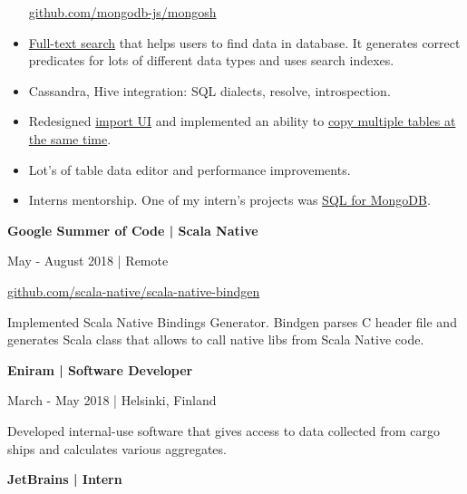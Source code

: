 \documentclass[9pt]{article}
\begin{document}
\begin{multicols}{2}
\begin{itemize}
\href{https://github.com/mongodb-js/mongosh/tree/main/packages/java-shell}{github.com/mongodb-js/mongosh}
\item \href{https://www.jetbrains.com/datagrip/whatsnew/2019-2/#version-2019-2-full-text-search}{Full-text search} that helps users to find data in database. It generates correct predicates for lots of different data types and uses search indexes.
\item Cassandra, Hive integration: SQL dialects, resolve, introspection.
\item Redesigned \href{https://www.jetbrains.com/datagrip/whatsnew/2021-3/#importexport}{import UI} and implemented an ability to \href{https://www.jetbrains.com/datagrip/whatsnew/2022-1/#importexport}{copy multiple tables at the same time}.
\item Lot's of table data editor and performance improvements.
\item Interns mentorship. One of my intern's projects was \href{https://www.jetbrains.com/datagrip/whatsnew/2020-3/#version-2020-3-sql-for-mongodb}{SQL for MongoDB}.
\end{itemize}

\vspace{1em}

{\textbf{Google Summer of Code | Scala Native}}

\color{gray} May - August 2018 | Remote \color{black}

\href{https://github.com/scala-native/scala-native-bindgen}{github.com/scala-native/scala-native-bindgen}

\vspace{0.3em}

Implemented Scala Native Bindings Generator.
Bindgen parses C header file and generates Scala class that allows to call native libs from Scala Native code.

\vspace{1.5em}

{\textbf{Eniram | Software Developer}}

\color{gray} March - May 2018 | Helsinki, Finland \color{black}

\vspace{0.3em}

Developed internal-use software that gives access to data collected from cargo ships and calculates various aggregates.

\vspace{1.5em}

{\textbf{JetBrains | Intern}}


\end{multicols}
\end{document}
